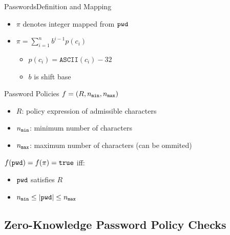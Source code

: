 \documentclass[notes,xcolor=dvipsnames]{beamer}
\begin{document}
\begin{frame}{Passwords}{Definition and Mapping}
\begin{itemize}
  \item $\pi$ denotes integer mapped from $\mathtt{pwd}$
  \item $\pi=\sum_{i=1}^n b^{i-1}p(c_i)$
  \begin{itemize}
    \item $p(c_i)=\texttt{ASCII}(c_i)-32$
    \item $b$ is shift base
  \end{itemize}
\end{itemize}

\end{frame}

\begin{frame}{Password Policies}
   $f=(R, {n_\mathtt{min}}, {n_\mathtt{max}})$
  \begin{itemize}
    \item $R$: policy expression of admissible characters
    \item ${n_\mathtt{min}}$: minimum number of characters
    \item ${n_\mathtt{max}}$: maximum number of characters (can be ommited)
  \end{itemize}
  
  \vspace*{2em}
  $f(\mathtt{pwd})=f(\pi)=\mathtt{true}$ iff:
  \begin{itemize}
    \item $\mathtt{pwd}$ satisfies $R$
    \item ${n_\mathtt{min}}\leq |\mathtt{pwd}| \leq {n_\mathtt{max}}$
  \end{itemize}
\end{frame}

\subsection[ZKPPC]{Zero-Knowledge Password Policy Checks}

%   
%   
\end{document}
